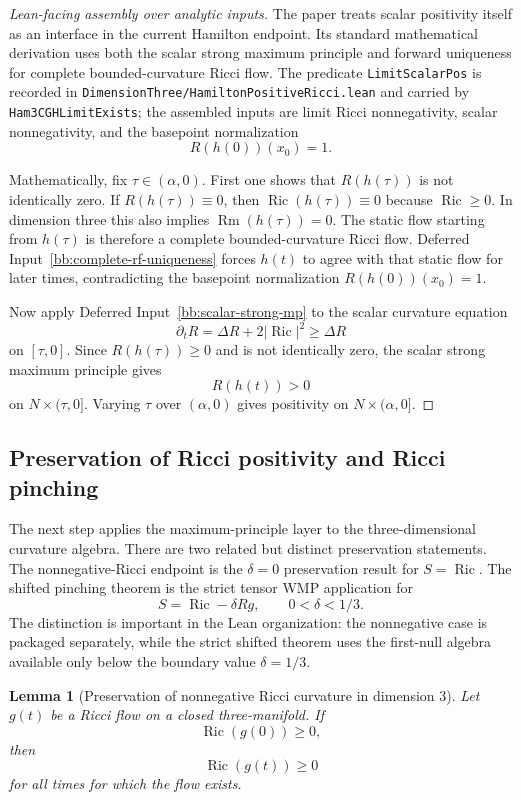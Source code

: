 \documentclass[11pt]{article}
\theoremstyle{plain}
\newtheorem{lemma}[theorem]{Lemma}
\theoremstyle{definition}
\theoremstyle{remark}
\newcommand{\Ric}{\operatorname{Ric}}
\newcommand{\Rm}{\operatorname{Rm}}
\newcommand{\norm}[1]{\left|#1\right|}
\newcommand{\del}{\delta}
\newcommand{\leanref}[1]{\nolinkurl{#1}}
\newcommand{\leanfile}[1]{\nolinkurl{#1}}
\newcommand{\rffile}[1]{\leanfile{#1}}
\begin{document}
\begin{proof}[Lean-facing assembly over analytic inputs]
The paper treats scalar positivity itself as an interface in the current
Hamilton endpoint.  Its standard mathematical derivation uses both the scalar
strong maximum principle and forward uniqueness for complete bounded-curvature
Ricci flow.  The predicate \leanref{LimitScalarPos} is recorded in
\rffile{DimensionThree/HamiltonPositiveRicci.lean} and carried by
\leanref{Ham3CGHLimitExists}; the assembled inputs are limit Ricci
nonnegativity, scalar nonnegativity, and the basepoint normalization
\[
  R(h(0))(x_0)=1.
\]

Mathematically, fix $\tau\in(\alpha,0)$.  First one shows that
$R(h(\tau))$ is not identically zero.  If $R(h(\tau))\equiv0$, then
$\Ric(h(\tau))\equiv0$ because $\Ric\ge0$.  In dimension three this also
implies $\Rm(h(\tau))=0$.  The static flow starting from $h(\tau)$ is
therefore a complete bounded-curvature Ricci flow.  Deferred
Input~\ref{bb:complete-rf-uniqueness} forces $h(t)$ to agree with that static
flow for later times, contradicting the basepoint normalization
$R(h(0))(x_0)=1$.

Now apply Deferred Input~\ref{bb:scalar-strong-mp} to the scalar curvature equation
\[
  \partial_tR=\Delta R+2\norm{\Ric}^2\ge\Delta R
\]
on $[\tau,0]$.  Since $R(h(\tau))\ge0$ and is not identically zero, the scalar
strong maximum principle gives
\[
  R(h(t))>0
\]
on $N\times(\tau,0]$.  Varying $\tau$ over $(\alpha,0)$ gives positivity on
$N\times(\alpha,0]$.
\end{proof}

\subsection{Preservation of Ricci positivity and Ricci pinching}



The next step applies the maximum-principle layer to the three-dimensional
curvature algebra.  There are two related but distinct preservation statements.
The nonnegative-Ricci endpoint is the \(\del=0\) preservation result for
\(S=\Ric\).  The shifted pinching theorem is the strict tensor WMP application
for
\[
  S=\Ric-\del Rg,\qquad 0<\del<1/3.
\]
The distinction is important in the Lean organization: the nonnegative case is
packaged separately, while the strict shifted theorem uses the first-null
algebra available only below the boundary value \(\del=1/3\).

\begin{lemma}[Preservation of nonnegative Ricci curvature in dimension $3$]
\label{lem:preserve-ricci-nonnegative}
Let $g(t)$ be a Ricci flow on a closed three-manifold. If
\[
\Ric(g(0))\ge0,
\]
then
\[
\Ric(g(t))\ge0
\]
for all times for which the flow exists.
\end{lemma}
\end{document}
